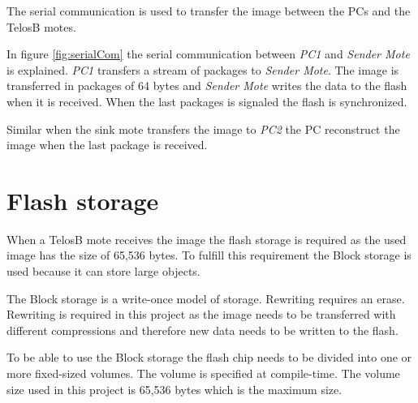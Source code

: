 


The serial communication is used to transfer the image between the PCs and the TelosB motes. 

In figure \ref{fig:serialCom} the serial communication between \emph{PC1} and \emph{Sender Mote} is explained. \emph{PC1} transfers a stream of packages to \emph{Sender Mote}. The image is transferred in packages of 64 bytes and \emph{Sender Mote} writes the data to the flash when it is received. When the last packages is signaled the flash is synchronized.


Similar when the sink mote transfers the image to \emph{PC2} the PC reconstruct the image when the last package is received.

\section{Flash storage}

When a TelosB mote receives the image the flash storage is required as the used image has the size of 65,536 bytes. To fulfill this requirement the Block storage is used because it can store large objects.

The Block storage is a write-once model of storage. Rewriting requires an erase. Rewriting is required in this project as the image needs to be transferred with different compressions and therefore new data needs to be written to the flash.

To be able to use the Block storage the flash chip needs to be divided into one or more fixed-sized volumes. The volume is specified at compile-time. The volume size used in this project is 65,536 bytes which is the maximum size.

